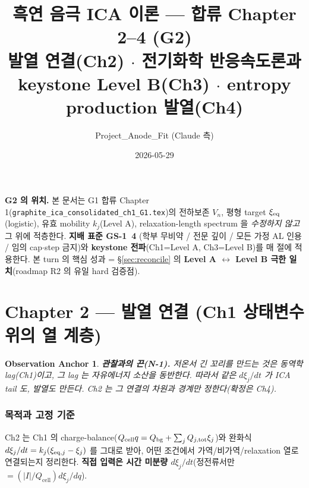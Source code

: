 \documentclass[11pt,a4paper]{article}
\title{\textbf{흑연 음극 ICA 이론 — 합류 Chapter 2--4 (G2)}\\[0.3em]
\large 발열 연결(Ch2) $\cdot$ 전기화학 반응속도론과 keystone Level B(Ch3) $\cdot$ entropy production 발열(Ch4)}
\author{Project\_Anode\_Fit (Claude 측)}\date{2026-05-29}
\newtheorem*{anchorbox}{Observation Anchor}
\newcommand{\cell}{\mathrm{cell}}\newcommand{\OCV}{\mathrm{OCV}}\newcommand{\irr}{\mathrm{irr}}
\begin{document}
\maketitle

\begin{mdframed}
\textbf{G2 의 위치.} 본 문서는 G1 합류 Chapter 1(\texttt{graphite\_ica\_consolidated\_ch1\_G1.tex})의
전하보존 $V_n$, 평형 target $\xi_{\mathrm{eq}}$(logistic), 유효 mobility $k_j$(Level A), relaxation-length
spectrum 을 \emph{수정하지 않고} 그 위에 적층한다. \textbf{지배 표준 GS-1~4} (학부 무비약 / 전문
깊이 / 모든 가정 AL 인용 / 임의 cap$\cdot$step 금지)와 \textbf{keystone 전파}(Ch1=Level A,
Ch3=Level B)를 매 절에 적용한다. 본 turn 의 핵심 성과 = \S\ref{sec:reconcile} 의 \textbf{Level A
$\leftrightarrow$ Level B 극한 일치}(roadmap R2 의 유일 hard 검증점).
\end{mdframed}
\tableofcontents
\newpage

\part*{Chapter 2 — 발열 연결 (Ch1 상태변수 위의 열 계층)}
\setcounter{section}{0}

\begin{anchorbox}
\textbf{관찰과의 끈(N-1).} 저온서 긴 꼬리를 만드는 것은 \emph{동역학 lag}(Ch1)이고, 그 lag 는
자유에너지 소산을 동반한다. 따라서 \emph{같은} $d\xi_j/dt$ 가 ICA tail 도, 발열도 만든다. Ch2 는
그 연결의 \emph{차원과 경계}만 정한다(확정은 Ch4).
\end{anchorbox}

\section{목적과 고정 기준}\label{sec:ch2_scope}
Ch2 는 Ch1 의 charge-balance($Q_\cell q=Q_\bg+\sum_j Q_{j,\tot}\xi_j$)와 완화식
$d\xi_j/dt=k_j(\xi_{\mathrm{eq},j}-\xi_j)$ 를 그대로 받아, 어떤 조건에서 가역/비가역/relaxation 열로
연결되는지 정리한다. \textbf{직접 입력은 시간 미분량 $d\xi_j/dt$}(정전류서만 $=(|I|/Q_\cell)d\xi_j/dq$).
\end{document}
